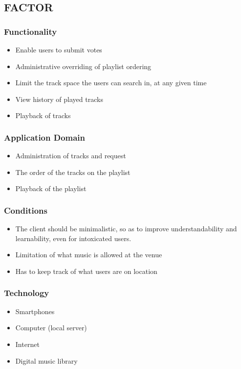 \subsection{FACTOR}
\subsubsection{Functionality}
\begin{itemize}
    \item Enable users to submit votes
    \item Administrative overriding of playlist ordering
    \item Limit the track space the users can search in, at any given time
    \item View history of played tracks
    \item Playback of tracks
\end{itemize}

\subsubsection{Application Domain}
\begin{itemize}
    \item Administration of tracks and request
    \item The order of the tracks on the playlist
    \item Playback of the playlist
\end{itemize}

\subsubsection{Conditions}
\begin{itemize}
    \item The client should be minimalistic, so as to improve understandability and learnability, even for intoxicated users. 
    \item Limitation of what music is allowed at the venue
    \item Has to keep track of what users are on location
\end{itemize}

\subsubsection{Technology}
\begin{itemize}
    \item Smartphones
    \item Computer (local server)
    \item Internet
    \item Digital music library
\end{itemize}

